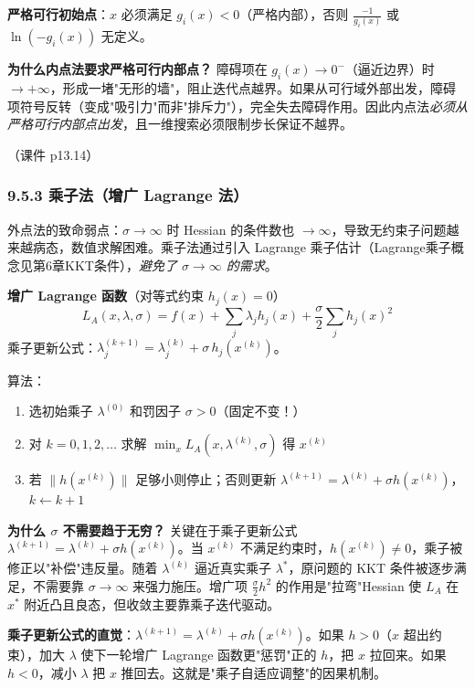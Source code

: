 \textbf{严格可行初始点}：$x$ 必须满足 $g_i(x) < 0$（严格内部），否则 $\frac{-1}{g_i(x)}$ 或 $\ln(-g_i(x))$ 无定义。

\textbf{为什么内点法要求严格可行内部点？}
障碍项在 $g_i(x) \to 0^-$（逼近边界）时 $\to +\infty$，形成一堵"无形的墙"，阻止迭代点越界。如果从可行域外部出发，障碍项符号反转（变成"吸引力"而非"排斥力"），完全失去障碍作用。因此内点法\emph{必须从严格可行内部点出发}，且一维搜索必须限制步长保证不越界。

（课件 p13.14）

\subsubsection{9.5.3 乘子法（增广 Lagrange 法）}

外点法的致命弱点：$\sigma \to \infty$ 时 Hessian 的条件数也 $\to \infty$，导致无约束子问题越来越病态，数值求解困难。乘子法通过引入 Lagrange 乘子估计（Lagrange乘子概念见第6章KKT条件），\emph{避免了 $\sigma \to \infty$ 的需求}。

\textbf{增广 Lagrange 函数}（对等式约束 $h_j(x)=0$）
\[
L_A(x, \lambda, \sigma) = f(x) + \sum_j \lambda_j h_j(x) + \frac{\sigma}{2}\sum_j h_j(x)^2
\]
乘子更新公式：$\lambda_j^{(k+1)} = \lambda_j^{(k)} + \sigma\, h_j(x^{(k)})$。

算法：
\begin{enumerate}
  \item 选初始乘子 $\lambda^{(0)}$ 和罚因子 $\sigma > 0$（固定不变！）
  \item 对 $k=0,1,2,\dots$ 求解 $\min_x L_A(x, \lambda^{(k)}, \sigma)$ 得 $x^{(k)}$
  \item 若 $\|h(x^{(k)})\|$ 足够小则停止；否则更新 $\lambda^{(k+1)} = \lambda^{(k)} + \sigma h(x^{(k)})$，$k \leftarrow k+1$
\end{enumerate}

\textbf{为什么 $\sigma$ 不需要趋于无穷？}
关键在于乘子更新公式 $\lambda^{(k+1)} = \lambda^{(k)} + \sigma h(x^{(k)})$。当 $x^{(k)}$ 不满足约束时，$h(x^{(k)}) \neq 0$，乘子被修正以"补偿"违反量。随着 $\lambda^{(k)}$ 逼近真实乘子 $\lambda^*$，原问题的 KKT 条件被逐步满足，不需要靠 $\sigma \to \infty$ 来强力施压。增广项 $\frac{\sigma}{2}h^2$ 的作用是"拉弯"Hessian 使 $L_A$ 在 $x^*$ 附近凸且良态，但收敛主要靠乘子迭代驱动。

\textbf{乘子更新公式的直觉}：$\lambda^{(k+1)} = \lambda^{(k)} + \sigma h(x^{(k)})$。如果 $h > 0$（$x$ 超出约束），加大 $\lambda$ 使下一轮增广 Lagrange 函数更"惩罚"正的 $h$，把 $x$ 拉回来。如果 $h < 0$，减小 $\lambda$ 把 $x$ 推回去。这就是"乘子自适应调整"的因果机制。

